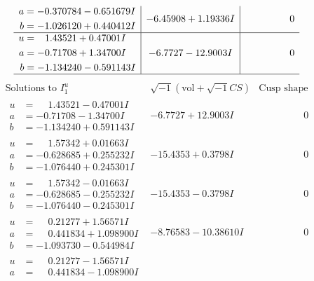\documentclass[1p]{elsarticle_modified}
\theoremstyle{definition}
\newcommand{\I}{\sqrt{-1}}
\begin{document}
$$\begin{array}{c|c|c}
\begin{aligned}
a &= -0.370784 - 0.651679 I \\
b &= -1.026120 + 0.440412 I\end{aligned}
 & -6.45908 + 1.19336 I & \phantom{-0.000000 } 0 \\ \hline\begin{aligned}
u &= \phantom{-}1.43521 + 0.47001 I \\
a &= -0.71708 + 1.34700 I \\
b &= -1.134240 - 0.591143 I\end{aligned}
 & -6.7727 - 12.9003 I & \phantom{-0.000000 } 0\\
 \hline 
 \end{array}$$\newpage$$\begin{array}{c|c|c}  
\text{Solutions to }I^u_{1}& \I (\text{vol} + \sqrt{-1}CS) & \text{Cusp shape}\\
 \hline 
\begin{aligned}
u &= \phantom{-}1.43521 - 0.47001 I \\
a &= -0.71708 - 1.34700 I \\
b &= -1.134240 + 0.591143 I\end{aligned}
 & -6.7727 + 12.9003 I & \phantom{-0.000000 } 0 \\ \hline\begin{aligned}
u &= \phantom{-}1.57342 + 0.01663 I \\
a &= -0.628685 + 0.255232 I \\
b &= -1.076440 + 0.245301 I\end{aligned}
 & -15.4353 + 0.3798 I & \phantom{-0.000000 } 0 \\ \hline\begin{aligned}
u &= \phantom{-}1.57342 - 0.01663 I \\
a &= -0.628685 - 0.255232 I \\
b &= -1.076440 - 0.245301 I\end{aligned}
 & -15.4353 - 0.3798 I & \phantom{-0.000000 } 0 \\ \hline\begin{aligned}
u &= \phantom{-}0.21277 + 1.56571 I \\
a &= \phantom{-}0.441834 + 1.098900 I \\
b &= -1.093730 - 0.544984 I\end{aligned}
 & -8.76583 - 10.38610 I & \phantom{-0.000000 } 0 \\ \hline\begin{aligned}
u &= \phantom{-}0.21277 - 1.56571 I \\
a &= \phantom{-}0.441834 - 1.098900 I \\

\end{aligned}
\end{array}$$
\end{document}
